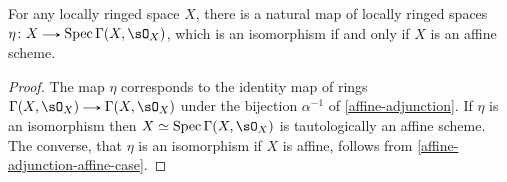 \begin{proposition}
  \begin{subcorollary}
    \label{affine-adjunction-unit}
    For any locally ringed space $X$, there is a natural map of locally ringed spaces $\eta \c X \to \Spec \Gamma(X,\sO_X)$, which is an isomorphism if and only if $X$ is an affine scheme.

    \begin{proof}
      The map $\eta$ corresponds to the identity map of rings $\Gamma(X,\sO_X) \to \Gamma(X,\sO_X)$ under the bijection $\alpha^{-1}$ of \cref{affine-adjunction}. If $\eta$ is an isomorphism then $X \iso \Spec \Gamma(X,\sO_X)$ is tautologically an affine scheme. The converse, that $\eta$ is an isomorphism if $X$ is affine, follows from \cref{affine-adjunction-affine-case}.
    \end{proof}
  \end{subcorollary}
\end{proposition}



